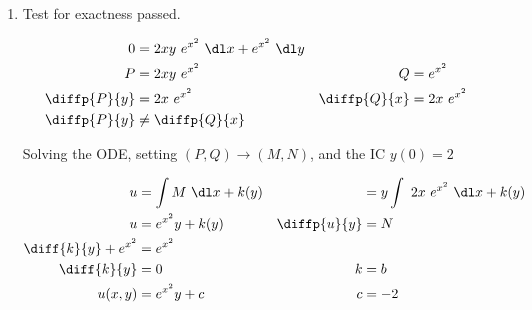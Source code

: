 \begin{enumerate}
    \item Test for exactness passed.

          \begin{align}
              0            & = 2 xy\ e^{x^{2}}\ \dl x + e^{x^{2}} \ \dl y   \\
              P            & = 2 xy\ e^{x^{2}}                            &
              Q            & = e^{x^{2}}                                    \\
              \diffp{P}{y} & = 2x\ e^{x^{2}}                              &
              \diffp{Q}{x} & = 2x\ e^{x^{2}}                                \\
              \diffp{P}{y} & \neq \diffp{Q}{x}
          \end{align}

          Solving the ODE, setting $ (P, Q) \to (M, N) $, and the IC $ y(0) = 2 $

          \begin{align}
              u                       & = \int M\ \dl x + k(y)                &
                                      & = y \int\ 2x\ e^{x^{2}}\ \dl x + k(y)   \\
              u                       & = e^{x^{2}}y + k(y)                   &
              \diffp{u}{y}            & = N                                     \\
              \diff{k}{y} + e^{x^{2}} & = e^{x^{2}}                             \\
              \diff{k}{y}             & = 0                                   &
              k                       & = b                                     \\
              u(x, y)                 & = e^{x^{2}}y + c                      &
              c                       & = -2
          \end{align}



\end{enumerate}
